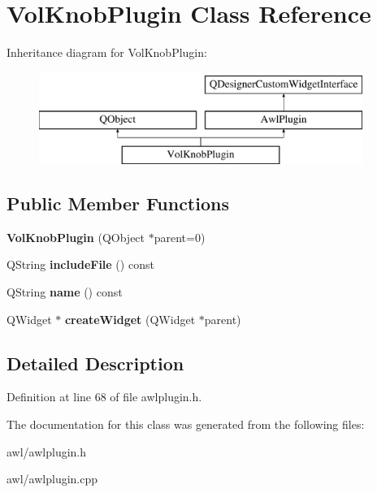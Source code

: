 \hypertarget{class_vol_knob_plugin}{}\section{Vol\+Knob\+Plugin Class Reference}
\label{class_vol_knob_plugin}
Inheritance diagram for Vol\+Knob\+Plugin\+:\begin{figure}[H]
\begin{center}
\leavevmode
\includegraphics[height=3.000000cm]{class_vol_knob_plugin}
\end{center}
\end{figure}
\subsection*{Public Member Functions}
\begin{DoxyCompactItemize}
\item 
\mbox{\label{class_vol_knob_plugin_abc9a7ec5be7b4a1bb8658500cbbf7cb4}} 
{\bfseries Vol\+Knob\+Plugin} (Q\+Object $\ast$parent=0)
\item 
\mbox{\label{class_vol_knob_plugin_ac25307efcd41e3a86ce4504e3931ae0c}} 
Q\+String {\bfseries include\+File} () const
\item 
\mbox{\label{class_vol_knob_plugin_aab6e643f32600145ad97eae43458229d}} 
Q\+String {\bfseries name} () const
\item 
\mbox{\label{class_vol_knob_plugin_ae3b453856d1b436cfa313b8ed20cac23}} 
Q\+Widget $\ast$ {\bfseries create\+Widget} (Q\+Widget $\ast$parent)
\end{DoxyCompactItemize}


\subsection{Detailed Description}


Definition at line 68 of file awlplugin.\+h.



The documentation for this class was generated from the following files\+:\begin{DoxyCompactItemize}
\item 
awl/awlplugin.\+h\item 
awl/awlplugin.\+cpp\end{DoxyCompactItemize}

